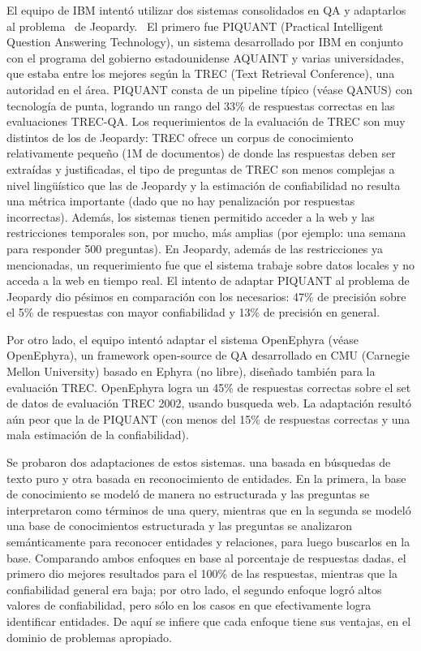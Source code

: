El equipo de IBM intentó utilizar dos sistemas consolidados en QA y
adaptarlos al problema \ de Jeopardy. \ El primero fue PIQUANT
(Practical Intelligent Question Answering Technology), un sistema
desarrollado por IBM en conjunto con el programa del gobierno
estadounidense AQUAINT y varias universidades, que estaba entre los
mejores según la TREC (Text Retrieval Conference), una autoridad en
el área. PIQUANT consta de un pipeline típico (véase QANUS) con
tecnología de punta, logrando un rango del 33\% de respuestas
correctas en las evaluaciones TREC-QA. Los requerimientos de la
evaluación de TREC son muy distintos de los de Jeopardy: TREC ofrece
un corpus de conocimiento relativamente pequeño (1M de documentos) de
donde las respuestas deben ser extraídas y justificadas, el tipo de
preguntas de TREC son menos complejas a nivel ling\"uístico que las
de Jeopardy y la estimación de confiabilidad no resulta una métrica
importante (dado que no hay penalización por respuestas incorrectas).
Además, los sistemas tienen permitido acceder a la web y las
restricciones temporales son, por mucho, más amplias (por ejemplo:
una semana para responder 500 preguntas). En Jeopardy, además de las
restricciones ya mencionadas, un requerimiento fue que el sistema
trabaje sobre datos locales y no acceda a la web en tiempo real. El
intento de adaptar PIQUANT al problema de Jeopardy dio pésimos en
comparación con los necesarios: 47\% de precisión sobre el 5\% de
respuestas con mayor confiabilidad y 13\% de precisión en general. 

Por otro lado, el equipo intentó adaptar el sistema OpenEphyra
(véase OpenEphyra), un framework open-source de QA desarrollado en
CMU (Carnegie Mellon University) basado en Ephyra (no libre),
diseñado también para la evaluación TREC. OpenEphyra logra un
45\% de respuestas correctas sobre el set de datos de evaluación TREC
2002, usando busqueda web. La adaptación resultó aún peor que la
de PIQUANT (con menos del 15\% de respuestas correctas y una mala
estimación de la confiabilidad). 

Se probaron dos adaptaciones de estos sistemas. una basada en
búsquedas de texto puro y otra basada en reconocimiento de entidades.
En la primera, la base de conocimiento se modeló de manera no
estructurada y las preguntas se interpretaron como términos de una
query, mientras que en la segunda se modeló una base de conocimientos
estructurada y las preguntas se analizaron semánticamente para
reconocer entidades y relaciones, para luego buscarlos en la base.
Comparando ambos enfoques en base al porcentaje de respuestas dadas, el
primero dio mejores resultados para el 100\% de las respuestas,
mientras que la confiabilidad general era baja; por otro lado, el
segundo enfoque logró altos valores de confiabilidad, pero sólo en
los casos en que efectivamente logra identificar entidades. De aquí
se infiere que cada enfoque tiene sus ventajas, en el dominio de
problemas apropiado.

